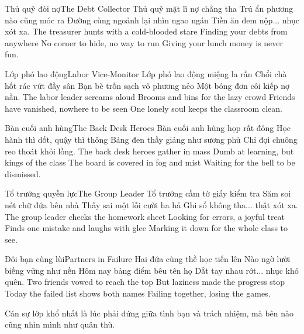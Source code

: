 \begin{tutuyetbox}{Thủ quỹ đòi nợ}{The Debt Collector}
Thủ quỹ mặt lì nợ chẳng tha
Trú ẩn phương nào cũng móc ra
Đường cùng ngoảnh lại nhìn ngao ngán
Tiền ăn đem nộp... nhục xót xa.
\tcblower
The treasurer hunts with a cold-blooded stare
Finding your debts from anywhere 
No corner to hide, no way to run 
Giving your lunch money is never fun.
\end{tutuyetbox}

\begin{tutuyetbox}{Lớp phó lao động}{Labor Vice-Monitor}
Lớp phó lao động miệng la rần
Chổi chà hốt rác vứt đầy sân
Bạn bè trốn sạch vô phương nẻo
Một bóng đơn côi kiếp nợ nần.
\tcblower
The labor leader screams aloud
Brooms and bins for the lazy crowd 
Friends have vanished, nowhere to be seen
One lonely soul keeps the classroom clean.
\end{tutuyetbox}

\begin{tutuyetbox}{Bàn cuối anh hùng}{The Back Desk Heroes}
Bàn cuối anh hùng họp rất đông
Học hành thì dốt, quậy thì thông
Bảng đen thầy giảng như sương phủ
Chỉ đợi chuông reo thoát khỏi lồng.
\tcblower
The back desk heroes gather in mass
Dumb at learning, but kings of the class 
The board is covered in fog and mist
Waiting for the bell to be dismissed.
\end{tutuyetbox}

\begin{tutuyetbox}{Tổ trưởng quyền lực}{The Group Leader}
Tổ trưởng cầm tờ giấy kiểm tra
Săm soi nét chữ đứa bên nhà
Thấy sai một lỗi cười ha hả
Ghi sổ không tha... thật xót xa.
\tcblower
The group leader checks the homework sheet
Looking for errors, a joyful treat 
Finds one mistake and laughs with glee
Marking it down for the whole class to see.
\end{tutuyetbox}

\begin{tutuyetbox}{Đôi bạn cùng lùi}{Partners in Failure}
Hai đứa cùng thề học tiến lên
Nào ngờ lười biếng vững như nền
Hôm nay bảng điểm bêu tên họ
Dắt tay nhau rớt... nhục khó quên.
\tcblower
Two friends vowed to reach the top
But laziness made the progress stop 
Today the failed list shows both names
Failing together, losing the games.
\end{tutuyetbox}

\begin{ghichu}
Cán sự lớp khổ nhất là lúc phải đứng giữa tình bạn và trách nhiệm, mà bên nào cũng nhìn mình như quân thù.
\end{ghichu}